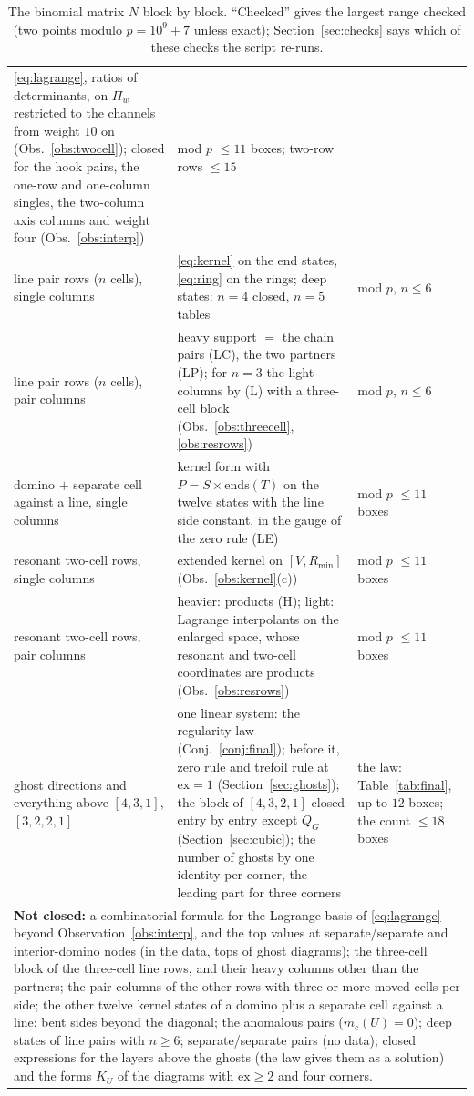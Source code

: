 \documentclass[11pt]{article}
\begin{document}
\begin{table}[htp]
\begin{tabular}{p{}p{}p{}}
\eqref{eq:lagrange}, ratios of determinants, on $\Pi_w$ restricted to the channels from weight $10$ on
(Obs.~\ref{obs:twocell}); closed for the hook pairs, the one-row and one-column singles, the two-column axis columns and
weight four (Obs.~\ref{obs:interp}) & mod $p$ $\le11$ boxes; two-row rows $\le15$\\
line pair rows ($n$ cells), single columns & \eqref{eq:kernel} on the end states, \eqref{eq:ring} on the rings; deep
states: $n=4$ closed, $n=5$ tables & mod $p$, $n\le6$\\
line pair rows ($n$ cells), pair columns & heavy support $=$ the chain pairs (LC), the two partners (LP); for $n=3$ the
light columns by (L) with a three-cell block (Obs.~\ref{obs:threecell}, \ref{obs:resrows}) & mod $p$, $n\le6$\\
domino $+$ separate cell against a line, single columns & kernel form with $P=S\times\mathrm{ends}(T)$ on the twelve
states with the line side constant, in the gauge of the zero rule (LE) & mod $p$ $\le11$ boxes\\
resonant two-cell rows, single columns & extended kernel on $[V,R_{\min}]$ (Obs.~\ref{obs:kernel}(c)) & mod $p$ $\le11$ boxes\\
resonant two-cell rows, pair columns & heavier: products (H); light: Lagrange interpolants on the enlarged space,
whose resonant and two-cell coordinates are products (Obs.~\ref{obs:resrows}) & mod $p$ $\le11$ boxes\\
ghost directions and everything above $[4,3,1]$, $[3,2,2,1]$ & one linear system: the regularity law
(Conj.~\ref{conj:final}); before it, zero rule and trefoil rule at $\mathrm{ex}=1$ (Section~\ref{sec:ghosts}); the block of
$[4,3,2,1]$ closed entry by entry except $Q_G$ (Section~\ref{sec:cubic}); the number of ghosts by one identity per corner,
the leading part for three corners & the law: Table~\ref{tab:final}, up to $12$ boxes; the count $\le18$ boxes\\
\midrule
\multicolumn{3}{p{0.95\textwidth}}{\textbf{Not closed:} a combinatorial formula for the Lagrange basis of
\eqref{eq:lagrange} beyond Observation~\ref{obs:interp}, and the top values at separate/separate and interior-domino nodes (in the data, tops of ghost
diagrams); the three-cell block of the three-cell line rows, and their heavy columns other than the partners; the pair
columns of the other rows with three or more moved cells per side; the other twelve kernel states of a domino plus a
separate cell against a line; bent sides beyond the diagonal; the anomalous pairs ($m_c(U)=0$); deep states of line pairs
with $n\ge6$; separate/separate pairs (no data); closed expressions for the layers above the ghosts (the law gives them as a
solution) and the forms $K_U$ of the diagrams with $\mathrm{ex}\ge2$ and four corners.}\\
\bottomrule
\end{tabular}
\caption{The binomial matrix $N$ block by block.  ``Checked'' gives the largest range checked (two points modulo
$p=10^9+7$ unless exact); Section~\ref{sec:checks} says which of these checks the script re-runs.}
\label{tab:N}
\end{table}
\end{document}
